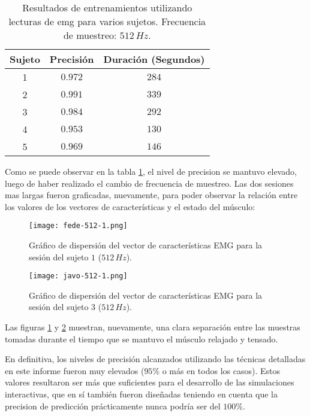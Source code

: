 \begin{table}[H]
\centering
\begin{tabular}{ |c|c|c| } 
 \hline
 Sujeto & Precisión & Duración (Segundos) \\ 
 \hline
 1 & $0.972$ & $284$ \\
 \hline
 2 & $0.991$ & $339$ \\
 \hline
 3 & $0.984$ & $292$ \\
 \hline
 4 & $0.953$ & $130$ \\
 \hline
 5 & $0.969$ & $146$ \\

 \hline
\end{tabular}
\caption{Resultados de entrenamientos utilizando lecturas de \acrshort{emg} para varios sujetos. Frecuencia de muestreo: $512\,Hz$.}
\label{tab:emg-results-512}
\end{table}
	
Como se puede observar en la tabla \ref{tab:emg-results-512}, el nivel de precision se mantuvo elevado, luego de haber realizado el cambio de frecuencia de muestreo. Las dos sesiones mas largas fueron graficadas, nuevamente, para poder observar la relación entre los valores de los vectores de características y el estado del músculo:

\begin{figure}[H]
	\centering
    \texttt{[image: fede-512-1.png]}
    \caption{Gráfico de dispersión del vector de características EMG para la sesión del sujeto $1$ ($512\,Hz$).}
	\label{fig:emg-graph-s1-512}
\end{figure}

\begin{figure}[H]
	\centering
    \texttt{[image: javo-512-1.png]}
    \caption{Gráfico de dispersión del vector de características EMG para la sesión del sujeto $3$ ($512\,Hz$).}
	\label{fig:emg-graph-s3-512}
\end{figure}

Las figuras \ref{fig:emg-graph-s1-512} y \ref{fig:emg-graph-s3-512} muestran, nuevamente, una clara separación entre las muestras tomadas durante el tiempo que se mantuvo el músculo relajado y tensado.

En definitiva, los niveles de precisión alcanzados utilizando las técnicas detalladas en este informe fueron muy elevados ($95\%$ o más en todos los casos). Estos valores resultaron ser más que suficientes para el desarrollo de las simulaciones interactivas, que en sí también fueron diseñadas teniendo en cuenta que la precision de predicción prácticamente nunca podría ser del $100\%$.

